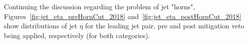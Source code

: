 \hspace{10pt} Continuing the discussion regarding the problem of jet "horns", Figures~\ref{fig:jet_eta_preHornCut_2018} and~\ref{fig:jet_eta_postHornCut_2018} show distributions of jet $\eta$ for the leading jet pair, pre and post mitigation veto being applied, respectively (for both categories).

\begin{figure}[htbp]
  \centering
      \\
\end{figure}
